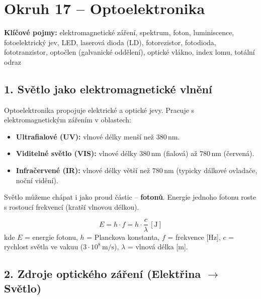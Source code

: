 \documentclass[a4paper,10pt]{article}
\newcommand{\jednotka}[1]{\,[\mathrm{#1}]}
\begin{document}
\section*{\large Okruh 17 – Optoelektronika}

\begin{pojmybox}
\textbf{Klíčové pojmy:}
elektromagnetické záření, spektrum, foton, luminiscence, fotoelektrický jev, LED, laserová dioda (LD), fotorezistor, fotodioda, fototranzistor, optočlen (galvanické oddělení), optické vlákno, index lomu, totální odraz
\end{pojmybox}

\begin{vysvetlenibox}

\subsection*{1. Světlo jako elektromagnetické vlnění}

Optoelektronika propojuje elektrické a optické jevy. Pracuje s elektromagnetickým zářením v oblastech:
\begin{itemize}
    \item \textbf{Ultrafialové (UV):} vlnové délky menší než $380\,\mathrm{nm}$.
    \item \textbf{Viditelné světlo (VIS):} vlnové délky $380\,\mathrm{nm}$ (fialová) až $780\,\mathrm{nm}$ (červená).
    \item \textbf{Infračervené (IR):} vlnové délky větší než $780\,\mathrm{nm}$ (typicky dálkové ovladače, noční vidění).
\end{itemize}

Světlo můžeme chápat i jako proud částic – \textbf{fotonů}. Energie jednoho fotonu roste s rostoucí frekvencí (kratší vlnovou délkou).

\begin{vzorcebox}
\[
E = h \cdot f = h \cdot \frac{c}{\lambda} \jednotka{J}
\]
kde $E$ = energie fotonu, $h$ = Planckova konstanta, $f$ = frekvence [Hz], $c$ = rychlost světla ve vakuu ($3\cdot 10^8\,\mathrm{m/s}$), $\lambda$ = vlnová délka [m].
\end{vzorcebox}

\subsection*{2. Zdroje optického záření (Elektřina $\to$ Světlo)}


\end{vysvetlenibox}
\end{document}
